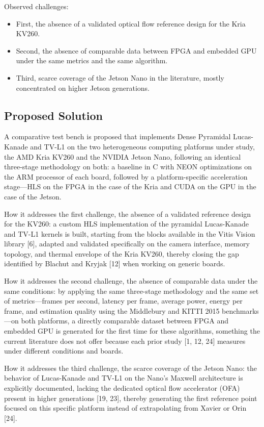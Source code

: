 \documentclass[conference]{IEEEtran}
\begin{document}
Observed challenges:

\begin{itemize}
    \item First, the absence of a validated optical flow reference design for the Kria KV260.
    \item Second, the absence of comparable data between FPGA and embedded GPU under the same metrics and the same algorithm.
    \item Third, scarce coverage of the Jetson Nano in the literature, mostly concentrated on higher Jetson generations.
\end{itemize}

\subsection{Proposed Solution}

A comparative test bench is proposed that implements Dense Pyramidal Lucas-Kanade and TV-L1 on the two heterogeneous computing platforms under study, the AMD Kria KV260 and the NVIDIA Jetson Nano, following an identical three-stage methodology on both: a baseline in C with NEON optimizations on the ARM processor of each board, followed by a platform-specific acceleration stage—HLS on the FPGA in the case of the Kria and CUDA on the GPU in the case of the Jetson.

How it addresses the first challenge, the absence of a validated reference design for the KV260: a custom HLS implementation of the pyramidal Lucas-Kanade and TV-L1 kernels is built, starting from the blocks available in the Vitis Vision library [6], adapted and validated specifically on the camera interface, memory topology, and thermal envelope of the Kria KV260, thereby closing the gap identified by Blachut and Kryjak [12] when working on generic boards.

How it addresses the second challenge, the absence of comparable data under the same conditions: by applying the same three-stage methodology and the same set of metrics—frames per second, latency per frame, average power, energy per frame, and estimation quality using the Middlebury and KITTI 2015 benchmarks—on both platforms, a directly comparable dataset between FPGA and embedded GPU is generated for the first time for these algorithms, something the current literature does not offer because each prior study [1, 12, 24] measures under different conditions and boards.

How it addresses the third challenge, the scarce coverage of the Jetson Nano: the behavior of Lucas-Kanade and TV-L1 on the Nano's Maxwell architecture is explicitly documented, lacking the dedicated optical flow accelerator (OFA) present in higher generations [19, 23], thereby generating the first reference point focused on this specific platform instead of extrapolating from Xavier or Orin [24].
\end{document}
